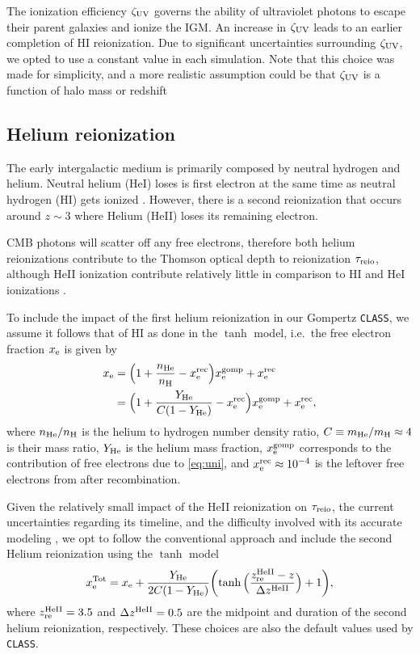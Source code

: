 The ionization efficiency $\zeta_\mathrm{UV}$ governs the ability of ultraviolet
photons to escape their parent galaxies and ionize the IGM. An increase
in $\zeta_\mathrm{UV}$ leads to an earlier completion of HI reionization.
Due to significant uncertainties surrounding $\zeta_\mathrm{UV}$, we opted to use
a constant value in each simulation.
Note that this choice was made for simplicity, and a more realistic
assumption could be that $\zeta_\mathrm{UV}$ is a function of halo mass
\cite{Park2019} or redshift


\subsection*{Helium reionization}
\label{ssec:helium}

The early intergalactic medium is primarily composed by neutral hydrogen
and helium.
Neutral helium (HeI) loses is first electron at the same time as neutral
hydrogen (HI) gets ionized \cite{Trac2007}.
However, there is a second reionization that occurs around $z\sim3$
where Helium (HeII) loses its remaining electron.

CMB photons will scatter off any free electrons, therefore both helium
reionizations contribute to the Thomson optical depth to reionization
$\tau_{\mathrm{reio}}$, although HeII ionization contribute relatively little in
comparison to HI and HeI ionizations \cite{Liu2016}.

To include the impact of the first helium reionization in our Gompertz
\texttt{CLASS}, we assume it follows that of HI as done in the $\tanh$
model, i.e.\ the free electron fraction $x_{\mathrm{e}}$ is given by
%
\begin{align}
\label{eq:xe_H_He}
x_\e
&= \Bigl(1 + \frac{n_\He}{n_\mathrm{H}} - x^\rec_\e\Bigr) x_\e^\gomp
  + x^\rec_\e
\nonumber\\
%
&= \Bigl(1 + \frac{Y_\He}{C (1 - Y_\He)} - x^\rec_\e\Bigr) x_\e^\gomp
  + x^\rec_\e,
\end{align}
%
where $n_{\mathrm{He}} / n_\mathrm{H}$ is the helium to hydrogen number density
ratio, $C \equiv m_{\mathrm{He}} / m_\mathrm{H} \approx 4$ is their mass ratio,
$Y_{\mathrm{He}}$ is the helium mass fraction, $x_{\mathrm{e}}^{\mathrm{gomp}}$ corresponds to the
contribution of free electrons due to \cref{eq:uni}, and $x^{\mathrm{rec}}_{\mathrm{e}}
\approx 10^{-4}$ is the leftover free electrons from after
recombination.

Given the relatively small impact of the HeII reionization on
$\tau_{\mathrm{reio}}$, the current uncertainties regarding its timeline, and the
difficulty involved with its accurate modeling \cite{Hotinli2023,
Upton2020}, we opt to follow the conventional approach and include the
second Helium reionization using the $\tanh$ model
%
\begin{equation}
\label{eq:xe_tot}
x_{\mathrm{e}}^\mathrm{Tot} = x_{\mathrm{e}} + \frac{Y_{\mathrm{He}}}{2C(1 - Y_{\mathrm{He}})}
  \biggl(\tanh{\Bigl(\frac{z_{\mathrm{re}}^{\mathrm{HeII}}- z}{\Delta z^{\mathrm{HeII}}}\Bigr)} + 1\biggr),
\end{equation}
%
where $z_{\mathrm{re}}^{\mathrm{HeII}} = 3.5$ and $\Delta z^{\mathrm{HeII}} = 0.5$ are the midpoint
and duration of the second helium reionization, respectively.
These choices are also the default values used by \texttt{CLASS}.


